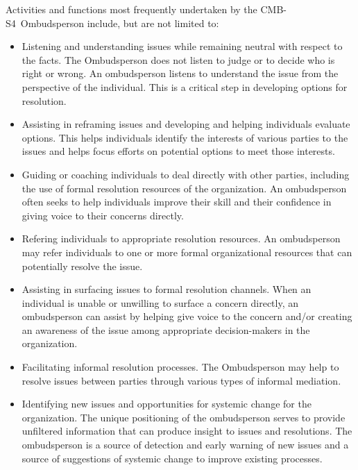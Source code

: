 \documentclass[12pt]{article}
\newcommand\collabname{CMB-S4}
\begin{document}
Activities and functions most frequently undertaken by the \collabname\ Ombudsperson include, but are not limited to:
\begin{itemize}

\item Listening and understanding issues while remaining neutral with respect to the facts. The Ombudsperson does not listen to judge or to decide who is right or wrong. An ombudsperson listens to understand the issue from the perspective of the individual. This is a critical step in developing options for resolution.

\item Assisting in reframing issues and developing and helping individuals evaluate options. This helps individuals identify the interests of various parties to the issues and helps focus efforts on potential options to meet those interests.

\item Guiding or coaching individuals to deal directly with other parties, including the use of formal resolution resources of the organization. An ombudsperson often seeks to help individuals improve their skill and their confidence in giving voice to their concerns directly.

\item Refering individuals to appropriate resolution resources. An ombudsperson may refer individuals to one or more formal organizational resources that can potentially resolve the issue.

\item Assisting in surfacing issues to formal resolution channels. When an individual is unable or unwilling to surface a concern directly, an ombudsperson can assist by helping give voice to the concern and/or creating an awareness of the issue among appropriate decision-makers in the organization.

\item Facilitating informal resolution processes. The Ombudsperson may help to resolve issues between parties through various types of informal mediation.

\item Identifying new issues and opportunities for systemic change for the organization. The unique positioning of the ombudsperson serves to provide unfiltered information that can produce insight to issues and resolutions. The ombudsperson is a source of detection and early warning of new issues and a source of suggestions of systemic change to improve existing processes.

\end{itemize}
\end{document}
